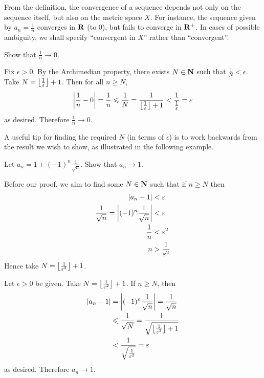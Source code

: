 \begin{remark}
From the definition, the convergence of a sequence depends not only on the sequence itself, but also on the metric space $X$. For instance, the sequence given by $a_n=\frac{1}{n}$ converges in $\mathbf R$ (to $0$), but fails to converge in $\mathbf R^+$. In cases of possible ambiguity, we shall specify ``convergent in $X$'' rather than ``convergent''. 
\end{remark}

\begin{example}
Show that $\frac{1}{n}\to 0$.
\begin{solution}
Fix $\epsilon>0$. By the Archimedian property, there exists $N\in\mathbf N$ such that $\frac{1}{N}<\epsilon$. Take $N=\left\lfloor \frac{1}{\varepsilon} \right\rfloor+1$. Then for all $n\ge N$,
\[\left|\frac{1}{n}-0\right|=\frac{1}{n}\leqslant\frac{1}{N}=\frac{1}{\left\lfloor \frac{1}{\varepsilon} \right\rfloor+1}<\frac{1}{\frac{1}{\varepsilon}}=\varepsilon\]
as desired. Therefore $\frac{1}{n}\to0$.
\end{solution}
\end{example}

A useful tip for finding the required $N$ (in terms of $\epsilon$) is to work backwards from the result we wish to show, as illustrated in the following example.

\begin{example}
Let $a_n=1+(-1)^n\frac{1}{\sqrt{n}}$. Show that $a_n\to 1$.

Before our proof, we aim to find some $N\in\mathbf N$ such that if $n\ge N$ then
\begin{align*}
|a_n-1|&<\varepsilon\\
\frac{1}{\sqrt{n}}=\left|(-1)^n\frac{1}{\sqrt{n}}\right|&<\varepsilon\\
\frac{1}{n}&<\varepsilon^2\\
n&>\frac{1}{\varepsilon^2}
\end{align*}
Hence take $N=\left\lfloor \frac{1}{\varepsilon^2} \right\rfloor+1$.

\begin{solution}
Let $\epsilon>0$ be given. Take $N=\left\lfloor \frac{1}{\varepsilon^2} \right\rfloor+1$. If $n\ge N$, then
\begin{align*}
|a_n-1|&=\left|(-1)^n\frac{1}{\sqrt{n}}\right|=\frac{1}{\sqrt{n}}\\
&\leqslant\frac{1}{\sqrt{N}}=\frac{1}{\sqrt{\left\lfloor \frac{1}{\varepsilon^2} \right\rfloor+1}}\\
&<\frac{1}{\sqrt{\frac{1}{\varepsilon^2}}}=\varepsilon
\end{align*}
as desired. Therefore $a_n\to1$.
\end{solution}
\end{example}

